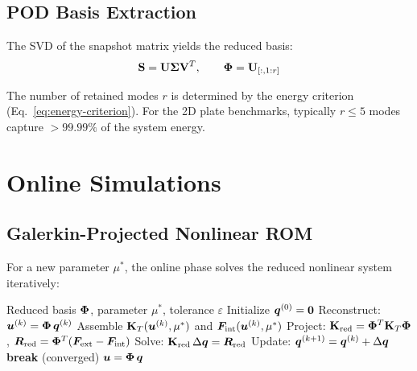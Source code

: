 \subsection{POD Basis Extraction}

The SVD of the snapshot matrix yields the reduced basis:
\begin{equation}
    \mathbf{S} = \mathbf{U} \mathbf{\Sigma} \mathbf{V}^T, \qquad \mathbf{\Phi} = \mathbf{U}_{[:, 1:r]}
\end{equation}

The number of retained modes $r$ is determined by the energy criterion (Eq.~\ref{eq:energy-criterion}). For the 2D plate benchmarks, typically $r \leq 5$ modes capture $>99.99\%$ of the system energy.

\section{Online Simulations}
\label{sec:online}

\subsection{Galerkin-Projected Nonlinear ROM}

For a new parameter $\mu^*$, the online phase solves the reduced nonlinear system iteratively:

\begin{algorithm}[H]
\caption{Online NL-ROM Query}
\label{alg:nl-rom}
\begin{algorithmic}[1]
\REQUIRE Reduced basis $\mathbf{\Phi}$, parameter $\mu^*$, tolerance $\varepsilon$
\STATE Initialize $\bm{q}^{(0)} = \bm{0}$
    \STATE Reconstruct: $\bm{u}^{(k)} = \mathbf{\Phi} \, \bm{q}^{(k)}$
    \STATE Assemble $\mathbf{K}_T(\bm{u}^{(k)}, \mu^*)$ and $\bm{F}_{\text{int}}(\bm{u}^{(k)}, \mu^*)$
    \STATE Project: $\mathbf{K}_{\text{red}} = \mathbf{\Phi}^T \mathbf{K}_T \mathbf{\Phi}$, \quad $\bm{R}_{\text{red}} = \mathbf{\Phi}^T (\bm{F}_{\text{ext}} - \bm{F}_{\text{int}})$
    \STATE Solve: $\mathbf{K}_{\text{red}} \, \Delta\bm{q} = \bm{R}_{\text{red}}$
    \STATE Update: $\bm{q}^{(k+1)} = \bm{q}^{(k)} + \Delta\bm{q}$
        \STATE \textbf{break} (converged)
    \ENDIF
\ENDFOR
\RETURN $\bm{u} = \mathbf{\Phi} \, \bm{q}$
\end{algorithmic}
\end{algorithm}

